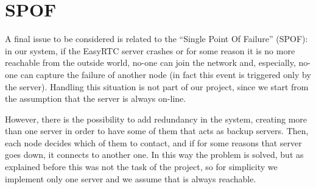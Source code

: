 \section{SPOF}
A final issue to be considered is related to the ``Single Point Of Failure'' (SPOF): in our system, if the EasyRTC server crashes or for some reason it is no more reachable from the outside world, no-one can join the network and, especially, no-one can capture the failure of another node (in fact this event is triggered only by the server). Handling this situation is not part of our project, since we start from the assumption that the server is always on-line.

However, there is the possibility to add redundancy in the system, creating more than one server in order to have some of them that acts as backup servers. Then, each node decides which of them to contact, and if for some reasons that server goes down, it connects to another one. In this way the problem is solved, but as explained before this was not the task of the project, so for simplicity we implement only one server and we assume that is always reachable.
